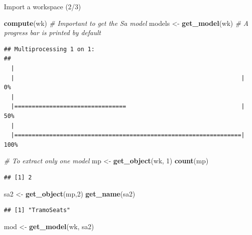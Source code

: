 \documentclass[10pt,xcolor=table,color={dvipsnames,usenames},ignorenonframetext,usepdftitle=false,french]{beamer}
\newenvironment{Shaded}{\begin{snugshade}}{\end{snugshade}}
\newcommand{\KeywordTok}[1]{\textcolor[rgb]{0.13,0.29,0.53}{\textbf{#1}}}
\newcommand{\DecValTok}[1]{\textcolor[rgb]{0.00,0.00,0.81}{#1}}
\newcommand{\StringTok}[1]{\textcolor[rgb]{0.31,0.60,0.02}{#1}}
\newcommand{\CommentTok}[1]{\textcolor[rgb]{0.56,0.35,0.01}{\textit{#1}}}
\newcommand{\NormalTok}[1]{#1}
\begin{document}
\begin{frame}[fragile]{Import a workspace (2/3)}

\footnotesize

\begin{Shaded}
\begin{Highlighting}[]
\KeywordTok{compute}\NormalTok{(wk) }\CommentTok{# Important to get the Sa model}
\NormalTok{models <-}\StringTok{ }\KeywordTok{get_model}\NormalTok{(wk) }\CommentTok{# A progress bar is printed by default}
\end{Highlighting}
\end{Shaded}

\begin{verbatim}
## Multiprocessing 1 on 1:
## 
  |                                                                       
  |                                                                 |   0%
  |                                                                       
  |================================                                 |  50%
  |                                                                       
  |=================================================================| 100%
\end{verbatim}

\begin{Shaded}
\begin{Highlighting}[]
\CommentTok{# To extract only one model}
\NormalTok{mp <-}\StringTok{ }\KeywordTok{get_object}\NormalTok{(wk, }\DecValTok{1}\NormalTok{)}
\KeywordTok{count}\NormalTok{(mp)}
\end{Highlighting}
\end{Shaded}

\begin{verbatim}
## [1] 2
\end{verbatim}

\begin{Shaded}
\begin{Highlighting}[]
\NormalTok{sa2 <-}\StringTok{ }\KeywordTok{get_object}\NormalTok{(mp,}\DecValTok{2}\NormalTok{)}
\KeywordTok{get_name}\NormalTok{(sa2)}
\end{Highlighting}
\end{Shaded}

\begin{verbatim}
## [1] "TramoSeats"
\end{verbatim}

\begin{Shaded}
\begin{Highlighting}[]
\NormalTok{mod <-}\StringTok{ }\KeywordTok{get_model}\NormalTok{(wk, sa2)}
\end{Highlighting}
\end{Shaded}


\end{frame}
\end{document}
